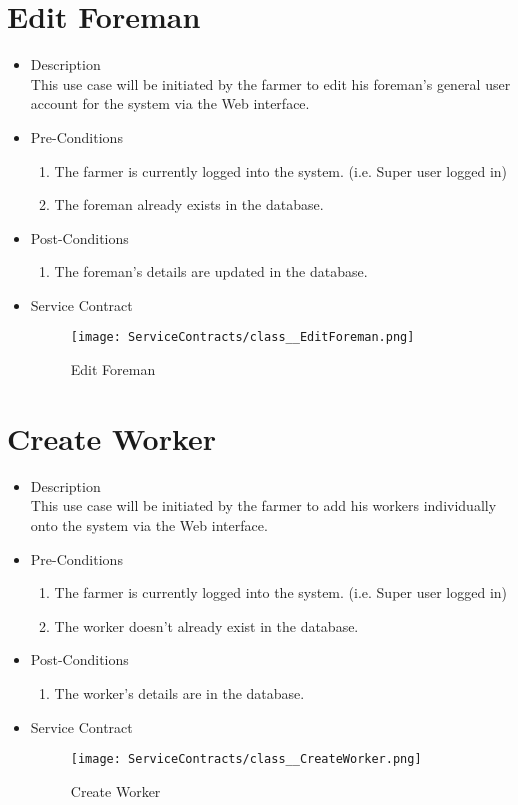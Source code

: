 \documentclass[11pt,fleqn]{book} %
\begin{document}
\section{Edit Foreman}
\begin{itemize}
	\item Description\\
	This use case will be initiated by the farmer to edit his foreman’s general user account for the system via the Web interface.
	\item Pre-Conditions
	\begin{enumerate}
		\item The farmer is currently logged into the system. (i.e. Super user logged in)
		\item The foreman already exists in the database.					
	\end{enumerate}
	\item Post-Conditions
	\begin{enumerate}
		\item The foreman’s details are updated in the database.
	\end{enumerate}
	\item Service Contract
	\begin{figure}
		\texttt{[image: ServiceContracts/class\_\_EditForeman.png]}
		\caption{Edit Foreman}
	\end{figure}
\end{itemize}

\section{Create Worker}
\begin{itemize}
	\item Description\\
	This use case will be initiated by the farmer to add his workers individually onto the system via the Web interface.
	\item Pre-Conditions
	\begin{enumerate}
		\item The farmer is currently logged into the system. (i.e. Super user logged in)
		\item The worker doesn’t already exist in the database.
	\end{enumerate}
	\item Post-Conditions
	\begin{enumerate}
		\item The worker’s details are in the database.			
	\end{enumerate}
	\item Service Contract
	\begin{figure}
		\texttt{[image: ServiceContracts/class\_\_CreateWorker.png]}
		\caption{Create Worker}
	\end{figure}
\end{itemize}
\end{document}
